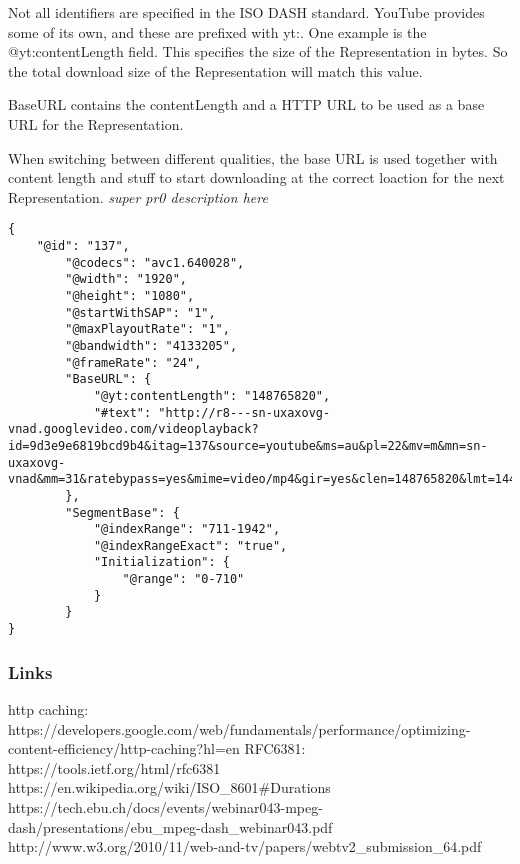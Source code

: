 Not all identifiers are specified in the ISO DASH standard. YouTube
provides some of its own, and these are prefixed with yt:. One example
is the @yt:contentLength field. This specifies the size of the
Representation in bytes. So the total download size of the
Representation will match this value.

BaseURL contains the contentLength and a HTTP URL to be used as a base
URL for the Representation.

When switching between different qualities, the base URL is used
together with content length and stuff to start downloading at the
correct loaction for the next Representation. \emph{super pr0
description here}

\begin{verbatim}
{
    "@id": "137",
        "@codecs": "avc1.640028",
        "@width": "1920",
        "@height": "1080",
        "@startWithSAP": "1",
        "@maxPlayoutRate": "1",
        "@bandwidth": "4133205",
        "@frameRate": "24",
        "BaseURL": {
            "@yt:contentLength": "148765820",
            "#text": "http://r8---sn-uxaxovg-vnad.googlevideo.com/videoplayback?id=9d3e9e6819bcd9b4&itag=137&source=youtube&ms=au&pl=22&mv=m&mn=sn-uxaxovg-vnad&mm=31&ratebypass=yes&mime=video/mp4&gir=yes&clen=148765820&lmt=1443591699166739&dur=531.864&fexp=9405989,9408209,9408710,9414764,9414930,9415870,9416126,9416179,9416984,9417132,9417707,9420934,9421175,9422460,9422592,9422596,9422674,9422867,9423429&sver=3&key=dg_yt0&upn=rTJyK8MSOVI&signature=466BA9528939E220DBE518CD8F8D00C971D3D818.0D8F0B72BC71EDC25B5CDFC9285B6A182811F218&mt=1446290848&ip=95.34.86.97&ipbits=0&expire=1446312558&sparams=ip,ipbits,expire,id,itag,source,ms,pl,mv,mn,mm,ratebypass,mime,gir,clen,lmt,dur"
        },
        "SegmentBase": {
            "@indexRange": "711-1942",
            "@indexRangeExact": "true",
            "Initialization": {
                "@range": "0-710"
            }
        }
}
\end{verbatim}

\subsubsection{Links}\label{links}

http caching:
https://developers.google.com/web/fundamentals/performance/optimizing-content-efficiency/http-caching?hl=en
RFC6381: https://tools.ietf.org/html/rfc6381
https://en.wikipedia.org/wiki/ISO\_8601\#Durations
https://tech.ebu.ch/docs/events/webinar043-mpeg-dash/presentations/ebu\_mpeg-dash\_webinar043.pdf
http://www.w3.org/2010/11/web-and-tv/papers/webtv2\_submission\_64.pdf
